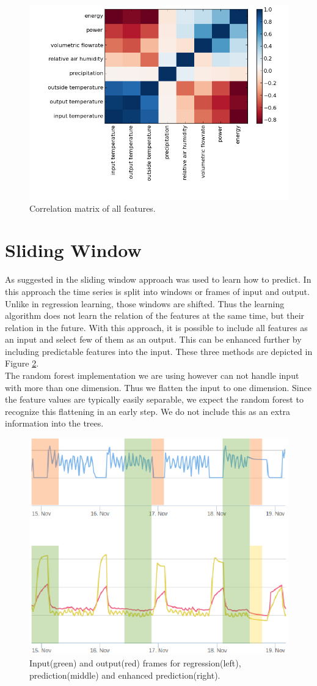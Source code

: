 \documentclass{scrartcl}
\begin{document}
\begin{figure}[H]
  \centering
  \includegraphics[width=0.5\linewidth]{img/correlation.png}
  \caption{Correlation matrix of all features.}
  \label{fig:correlation}
\end{figure}

\section{Sliding Window}
\label{sec:slidingwindow}
As suggested in \cite{vafaeipour2014application} the sliding window approach was used to learn how to predict. In this approach the time series is split into windows or frames of input and output. Unlike in regression learning, those windows are shifted. Thus the learning algorithm does not learn the relation of the features at the same time, but their relation in the future. With this approach, it is possible to include all features as an input and select few of them as an output. This can be enhanced further by including predictable features into the input. These three methods are depicted in Figure \ref{fig:slidingwindow}.\\
The random forest implementation we are using however can not handle input with more than one dimension. Thus we flatten the input to one dimension. Since the feature values are typically easily separable, we expect the random forest to recognize this flattening in an early step. We do not include this as an extra information into the trees.

\begin{figure}[H]
  \centering
    \includegraphics[width=0.5\linewidth]{img/regpred.png}
  \caption{Input(green) and output(red) frames for regression(left), prediction(middle) and enhanced prediction(right).}
  \label{fig:slidingwindow}
\end{figure}
\end{document}
